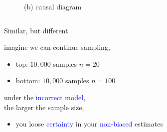 \begin{frame}
\begin{columns}
\begin{column}{0.5\textwidth}
\begin{figure}
				\caption*{(b) causal diagram}
			\end{figure}
		\end{column}
	\end{columns}
\end{frame}
%
%
\begin{lhframe}[rhgraphic={\texttt{[image: descendant3b\_samplesize.pdf]}}]
	{Similar, but different}
	
	imagine we can continue sampling,
	\begin{itemize}
		\item top: $10,000$ samples $n=20$
		\item bottom: $10,000$ samples $n=100$
	\end{itemize}
	
	under the \textcolor{blue}{incorrect model},\\
	the larger the sample size,
	\begin{itemize}
		\item you loose \textcolor{blue}{certainty} in your \textcolor{blue}{non-biased} estimates
	\end{itemize}
\end{lhframe}
%
%
